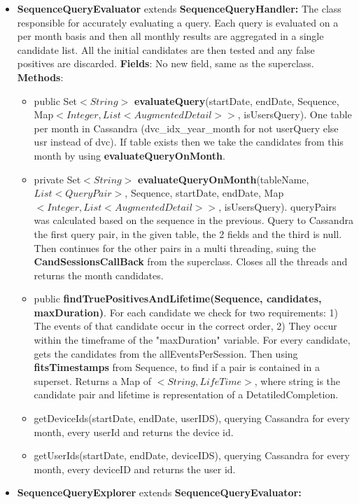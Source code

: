 \documentclass{article}
\begin{document}
\begin{itemize}
	\item \textbf{SequenceQueryEvaluator} extends \textbf{SequenceQueryHandler: }The class responsible for accurately evaluating a query. Each query is evaluated on a per month basis and then all monthly results are
	aggregated in a single candidate list. All the initial candidates are then tested and any false positives are discarded.
	\textbf{Fields}: No new field, same as the superclass.
	\textbf{Methods}:\\
	\begin{itemize}
		\item public Set$<String>$ \textbf{evaluateQuery}(startDate, endDate, Sequence, Map$<Integer, List<AugmentedDetail>>$, isUsersQuery). One table per month in Cassandra (dvc\_idx\_year\_month for not userQuery else usr instead of dvc). If table exists then we take the candidates from this month by using \textbf{evaluateQueryOnMonth}.
		\item private Set$<String>$ \textbf{evaluateQueryOnMonth}(tableName, $List<QueryPair>$, Sequence, startDate, endDate, Map$<Integer, List<AugmentedDetail>>$, isUsersQuery). queryPairs was calculated based on the sequence in the previous. Query to Cassandra the first query pair, in the given table, the 2 fields and the third is null. Then continues for the other pairs in a multi threading, suing the \textbf{CandSessionsCallBack} from the superclass. Closes all the threads and returns the month candidates.
		\item public \textbf{findTruePositivesAndLifetime(Sequence, candidates, maxDuration)}. For each candidate we check for two requirements: 1) The events of that candidate occur in the correct order,
		2) They occur within the timeframe of the "maxDuration" variable. For every candidate, gets the candidates from the allEventsPerSession. Then using \textbf{fitsTimestamps} from Sequence, to find if a pair is contained in a superset. Returns a Map of $<String,LifeTime>$, where string is the candidate pair and lifetime is representation of a DetatiledCompletion.
		\item getDeviceIds(startDate, endDate, userIDS), querying Cassandra for every month, every userId and returns the device id.
		\item getUserIds(startDate, endDate, deviceIDS), querying Cassandra for every month, every deviceID and returns the user id.
	\end{itemize}
	\item \textbf{SequenceQueryExplorer} extends \textbf{SequenceQueryEvaluator:}
\end{itemize}
\end{document}
